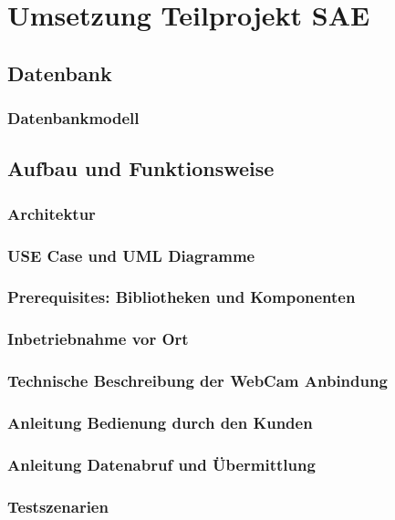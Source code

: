 \chapter{Umsetzung Teilprojekt SAE}

\section{Datenbank}
\subsection{Datenbankmodell}

\section{Aufbau und Funktionsweise}
\subsection{Architektur}
\subsection{USE Case und UML Diagramme}
\subsection{Prerequisites: Bibliotheken und Komponenten}
\subsection{Inbetriebnahme vor Ort}
\subsection{Technische Beschreibung der WebCam Anbindung}
\subsection{Anleitung Bedienung durch den Kunden}
\subsection{Anleitung Datenabruf und Übermittlung}
\subsection{Testszenarien}

